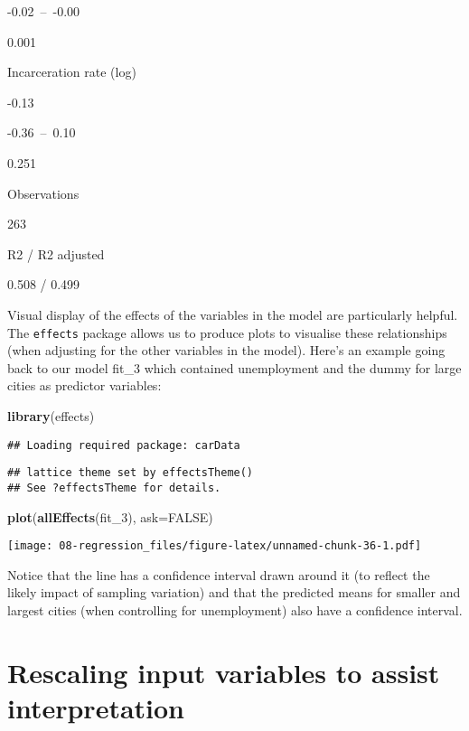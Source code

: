 \documentclass[
]{book}
\newenvironment{Shaded}{\begin{snugshade}}{\end{snugshade}}
\newcommand{\AttributeTok}[1]{\textcolor[rgb]{0.13,0.29,0.53}{#1}}
\newcommand{\ConstantTok}[1]{\textcolor[rgb]{0.56,0.35,0.01}{#1}}
\newcommand{\FunctionTok}[1]{\textcolor[rgb]{0.13,0.29,0.53}{\textbf{#1}}}
\newcommand{\NormalTok}[1]{#1}
\begin{document}
-0.02~--~-0.00

0.001

Incarceration rate (log)

-0.13

-0.36~--~0.10

0.251

Observations

263

R2 / R2 adjusted

0.508 / 0.499

Visual display of the effects of the variables in the model are particularly helpful. The \texttt{effects} package allows us to produce plots to visualise these relationships (when adjusting for the other variables in the model). Here's an example going back to our model fit\_3 which contained unemployment and the dummy for large cities as predictor variables:

\begin{Shaded}
\begin{Highlighting}[]
\FunctionTok{library}\NormalTok{(effects)}
\end{Highlighting}
\end{Shaded}

\begin{verbatim}
## Loading required package: carData
\end{verbatim}

\begin{verbatim}
## lattice theme set by effectsTheme()
## See ?effectsTheme for details.
\end{verbatim}

\begin{Shaded}
\begin{Highlighting}[]
\FunctionTok{plot}\NormalTok{(}\FunctionTok{allEffects}\NormalTok{(fit\_3), }\AttributeTok{ask=}\ConstantTok{FALSE}\NormalTok{)}
\end{Highlighting}
\end{Shaded}

\texttt{[image: 08-regression\_files/figure-latex/unnamed-chunk-36-1.pdf]}

Notice that the line has a confidence interval drawn around it (to reflect the likely impact of sampling variation) and that the predicted means for smaller and largest cities (when controlling for unemployment) also have a confidence interval.

\section{Rescaling input variables to assist interpretation}\label{rescaling-input-variables-to-assist-interpretation}
\end{document}

